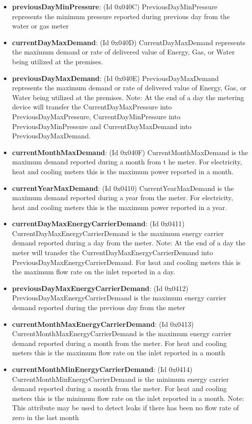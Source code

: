 \begin{itemize}
\item \textbf{previousDayMinPressure}: (Id 0x040C) PreviousDayMinPressure represents the minimum pressure reported during previous day from the water or gas meter
\item \textbf{currentDayMaxDemand}: (Id 0x040D) CurrentDayMaxDemand represents the maximum demand or rate of delivered value of Energy, Gas, or Water being utilized at the premises.
\item \textbf{previousDayMaxDemand}: (Id 0x040E) PreviousDayMaxDemand represents the maximum demand or rate of delivered value of Energy, Gas, or Water being utilized at the premises. Note: At the end of a day the metering device will transfer the CurrentDayMaxPressure into PreviousDayMaxPressure, CurrentDayMinPressure into PreviousDayMinPressure and CurrentDayMaxDemand into PreviousDayMaxDemand.
\item \textbf{currentMonthMaxDemand}: (Id 0x040F) CurrentMonthMaxDemand is the maximum demand reported during a month from t he meter. For electricity, heat and cooling meters this is the maximum power reported in a month.
\item \textbf{currentYearMaxDemand}: (Id 0x0410) CurrentYearMaxDemand is the maximum demand reported during a year from the meter. For electricity, heat and cooling meters this is the maximum power reported in a year.
\item \textbf{currentDayMaxEnergyCarrierDemand}: (Id 0x0411) CurrentDayMaxEnergyCarrierDemand is the maximum energy carrier demand reported during a day from the meter. Note: At the end of a day the meter will transfer the CurrentDayMaxEnergyCarrierDemand into PreviousDayMaxEnergyCarrierDemand. For heat and cooling meters this is the maximum flow rate on the inlet reported in a day.
\item \textbf{previousDayMaxEnergyCarrierDemand}: (Id 0x0412) PreviousDayMaxEnergyCarrierDemand is the maximum energy carrier demand reported during the previous day from the meter
\item \textbf{currentMonthMaxEnergyCarrierDemand}: (Id 0x0413) CurrentMonthMaxEnergyCarrierDemand is the maximum energy carrier demand reported during a month from the meter. For heat and cooling meters this is the maximum flow rate on the inlet reported in a month
\item \textbf{currentMonthMinEnergyCarrierDemand}: (Id 0x0414) CurrentMonthMinEnergyCarrierDemand is the minimum energy carrier demand reported during a month from the meter. For heat and cooling meters this is the minimum flow rate on the inlet reported in a month. Note: This attribute may be used to detect leaks if there has been no flow rate of zero in the last month

\end{itemize}
